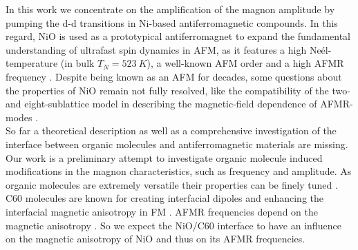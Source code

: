 In this work we concentrate on the amplification of the magnon amplitude by pumping the d-d transitions in Ni-based antiferromagnetic compounds.
In this regard, NiO is used as a prototypical antiferromagnet to expand the fundamental understanding of ultrafast spin dynamics in AFM, as it features a high Neél-temperature (in bulk $T_N=\qty{523}{K}$), a well-known AFM order and a high AFMR frequency \cite{rezende_introduction_2019}.
Despite being known as an AFM for decades, some questions about the properties of NiO remain not fully resolved, like the compatibility of the two- and eight-sublattice model in describing the magnetic-field dependence of AFMR-modes \cite{ohmichi_frequency-domain_2022}. \\
So far a theoretical description as well as a comprehensive investigation of the interface between organic molecules and antiferromagnetic materials are missing.
Our work is a preliminary attempt to investigate organic molecule induced modifications in the magnon characteristics, such as frequency and amplitude.
As organic molecules are extremely versatile their properties can be finely tuned \cite{sanvito_molecular_2011}.
C60 molecules are known for creating interfacial dipoles \cite{veenstra_interface_2002} and enhancing the interfacial magnetic anisotropy in FM \cite{bairagi_tuning_2015}.
AFMR frequencies depend on the magnetic anisotropy \cite{rezende_introduction_2019}.
So we expect the NiO/C60 interface to have an influence on the magnetic anisotropy of NiO and thus on its AFMR frequencies.


